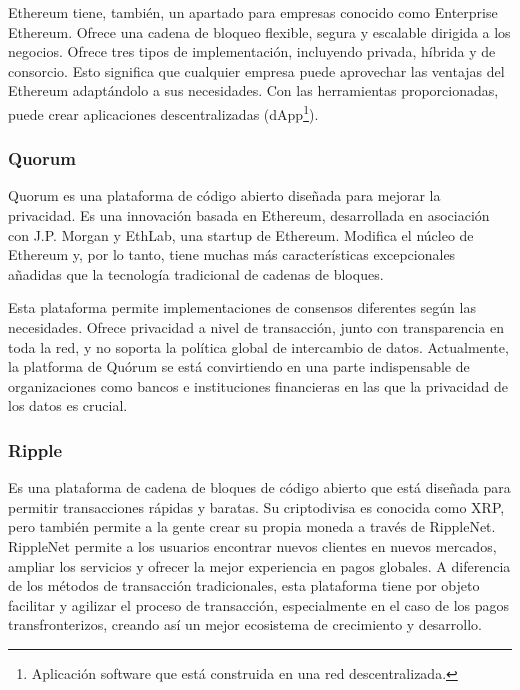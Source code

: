 \noindent Ethereum tiene, también, un apartado para empresas conocido como Enterprise Ethereum. Ofrece una cadena de 
bloqueo flexible, segura y escalable dirigida a los negocios. Ofrece tres tipos de implementación, incluyendo privada, 
híbrida y de consorcio. Esto significa que cualquier empresa puede aprovechar las ventajas del Ethereum adaptándolo a 
sus necesidades. Con las herramientas proporcionadas, puede crear aplicaciones descentralizadas (dApp\footnote{
Aplicación software que está construida en una red descentralizada.\label{fnlabel}}). 

\subsubsection*{Quorum}

Quorum es una plataforma de código abierto diseñada para mejorar la privacidad. Es una innovación basada en Ethereum, 
desarrollada en asociación con J.P. Morgan y EthLab, una startup de Ethereum. Modifica el núcleo de Ethereum y, por lo 
tanto, tiene muchas más características excepcionales añadidas que la tecnología tradicional de cadenas de bloques.

\vspace{5mm}

\noindent Esta plataforma permite implementaciones de consensos diferentes según las necesidades. Ofrece privacidad a 
nivel de transacción, junto con transparencia en toda la red, y no soporta la política global de intercambio de datos. 
Actualmente, la platforma de Quórum se está convirtiendo en una parte indispensable de organizaciones como bancos e 
instituciones financieras en las que la privacidad de los datos es crucial.

\subsubsection*{Ripple}

Es una plataforma de cadena de bloques de código abierto que está diseñada para permitir transacciones rápidas y 
baratas. Su criptodivisa es conocida como XRP, pero también permite a la gente crear su propia moneda a través de 
RippleNet. RippleNet permite a los usuarios encontrar nuevos clientes en nuevos mercados, ampliar los servicios y 
ofrecer la mejor experiencia en pagos globales. A diferencia de los métodos de transacción tradicionales, esta 
plataforma tiene por objeto facilitar y agilizar el proceso de transacción, especialmente en el caso de los pagos 
transfronterizos, creando así un mejor ecosistema de crecimiento y desarrollo.

